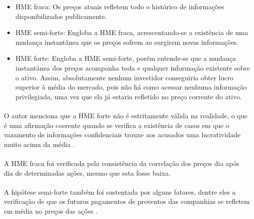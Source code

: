 \begin{itemize}
    \item HME fraca: Os preços atuais refletem todo o histórico de informações disponibilizados publicamente.
    \item HME semi-forte: Engloba a HME fraca, acrescentando-se a existência de uma mudança instantânea que os preços sofrem ao surgirem novas informações.
    \item HME forte: Engloba a HME semi-forte, porém entende-se que a mudança instantânea dos preços acompanha toda e qualquer informação existente sobre o ativo. Assim, absolutamente nenhum investidor conseguiria obter lucro superior à média do mercado, pois não há como acessar nenhuma informação privilegiada, uma vez que ela já estaria refletido no preço corrente do ativo.
\end{itemize}

\paragraph{} O autor menciona que a HME forte não é estritamente válida na realidade, o que é uma afirmação coerente quando se verifica a existência de casos em que o vazamento de informações confidenciais trouxe aos acusados uma lucratividade muito acima da média \cite{insider_trading}.

\paragraph{} A HME fraca foi verificada pela consistência da correlação dos preços dia após dia de determinadas ações, mesmo que esta fosse baixa.

\paragraph{} A hipótese semi-forte também foi sustentada por alguns fatores, dentre eles a verificação de que os futuros pagamentos de proventos das companhias se refletem em média no preços das ações \cite{fama1969adjustment}.

